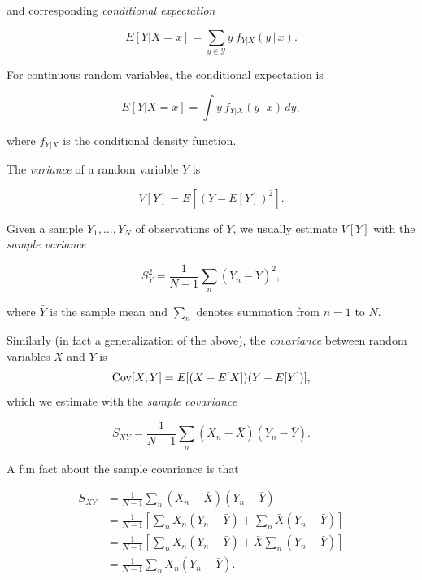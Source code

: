 \documentclass[12pt,oneside,openany]{book}
\begin{document}
and corresponding \emph{conditional expectation}

\begin{equation}
E[Y | X = x]
= \sum_{y \in \mathcal{Y}} y \: f_{Y|X}(y \,|\, x).
\end{equation}

For continuous random variables, the conditional expectation is

\begin{equation}
E[Y | X = x]
= \int y \: f_{Y|X} (y \,|\, x) \, dy,
\end{equation}

where \(f_{Y|X}\) is the conditional density function.

The \emph{variance} of a random variable \(Y\) is

\begin{equation}
V[Y] = E[(Y - E[Y])^2].
\end{equation}

Given a sample \(Y_1, \ldots, Y_N\) of observations of \(Y\), we usually
estimate \(V[Y]\) with the \emph{sample variance}

\begin{equation}
S_Y^2 = \frac{1}{N-1} \sum_n (Y_n - \bar{Y})^2,
\end{equation}

where \(\bar{Y}\) is the sample mean and \(\sum_n\) denotes summation
from \(n = 1\) to \(N\).

Similarly (in fact a generalization of the above), the \emph{covariance}
between random variables \(X\) and \(Y\) is \[
\mathop{\rm Cov}\nolimits[X, Y] = E[(X - E[X]) (Y - E[Y])],
\] which we estimate with the \emph{sample covariance}

\begin{equation}
S_{XY} = \frac{1}{N-1} \sum_n (X_n - \bar{X}) (Y_n - \bar{Y}).
\end{equation}

A fun fact about the sample covariance is that

\begin{align}
S_{XY}
&= \frac{1}{N-1} \sum_n (X_n - \bar{X}) (Y_n - \bar{Y}) \\
&= \frac{1}{N-1} \left[ \sum_n X_n (Y_n - \bar{Y}) + \sum_n \bar{X} (Y_n - \bar{Y}) \right] \\
&= \frac{1}{N-1} \left[ \sum_n X_n (Y_n - \bar{Y}) + \bar{X} \sum_n (Y_n - \bar{Y}) \right] \\
&= \frac{1}{N-1} \sum_n X_n (Y_n - \bar{Y}).
\end{align}
\end{document}
